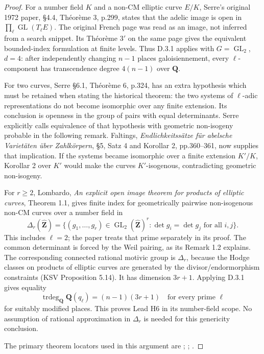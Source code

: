 \begin{proof}
For a number field
\(K\) and a non-CM elliptic curve \(E/K\), Serre's original 1972
paper, §4.4, Théorème 3, p.299, states that the adelic image is open
in \(\prod_\ell\operatorname{GL}(T_\ell E)\). The original French
page was read as an image, not inferred from a search snippet. Its
Théorème 3\ensuremath{\prime} on the same page gives the equivalent bounded-index
formulation at finite levels. Thus D.3.1 applies with
\(G=\operatorname{GL}_2\), \(d=4\): after independently changing
\(n-1\) places galoisiennement, every \(\ell\)-component has
transcendence degree \(4(n-1)\) over \(\mathbf Q\).

For two curves, Serre §6.1, Théorème 6, p.324, has an extra hypothesis
which must be retained when stating the historical theorem: the two
systems of \(\ell\)-adic representations do not become isomorphic
over any finite extension. Its conclusion is openness in the group
of pairs with equal determinants. Serre explicitly calls equivalence
of that hypothesis with geometric non-isogeny probable in the
following remark. Faltings, \emph{Endlichkeitssätze für abelsche Varietäten
über Zahlkörpern}, §5, Satz 4 and Korollar 2, pp.360--361, now supplies
that implication. If the systems became isomorphic over a finite
extension \(K'/K\), Korollar 2 over \(K'\) would make the curves
\(K'\)-isogenous, contradicting geometric non-isogeny.

For \(r\ge2\), Lombardo, \emph{An explicit open image theorem for products
of elliptic curves}, Theorem 1.1, gives finite index for geometrically
pairwise non-isogenous non-CM curves over a number field in
\[
\Delta_r(\widehat{\mathbf Z})=
\{(g_1,\ldots,g_r)\in\operatorname{GL}_2(\widehat{\mathbf Z})^r:
\det g_i=\det g_j\text{ for all }i,j\}.
\tag{D.3.2.1}
\]
This includes \(\ell=2\); the paper treats that prime separately in
its proof. The common determinant is forced by the Weil pairing, as
its Remark 1.2 explains. The corresponding connected rational
motivic group is \(\Delta_r\), because the Hodge classes on products
of elliptic curves are generated by the divisor/endormorphism
constraints (KSV Proposition 5.14). It has dimension \(3r+1\).
Applying D.3.1 gives equality
\[
\operatorname{trdeg}_{\mathbf Q}\mathbf Q(q_\ell)
=(n-1)(3r+1)\quad\text{for every prime }\ell
\]
for suitably modified places. This proves Lead H6 in its number-field
scope. No assumption of rational approximation in \(\Delta_r\) is
needed for this genericity conclusion.

The primary theorem locators used in this argument are \cite[\S4.4, Th\'eor\`eme 3, p.299; \S6.1, Th\'eor\`eme 6, p.324]{GenSerre1972}; \cite[\S5, Satz 4 and Korollar 2, pp.360--361]{GenFaltings1983}; \cite[Theorem 1.1 and Remark 1.2]{GenLombardo}.
\end{proof}

